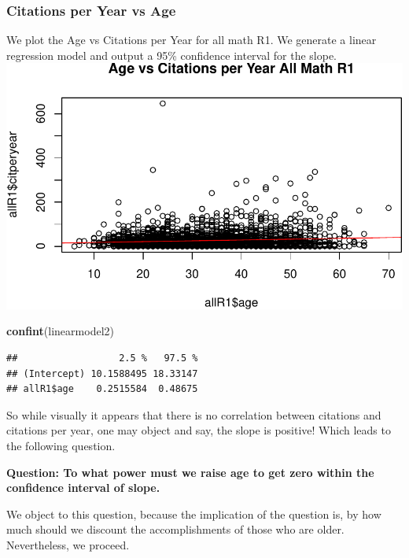 \documentclass[]{article}
\newenvironment{Shaded}{\begin{snugshade}}{\end{snugshade}}
\newcommand{\KeywordTok}[1]{\textcolor[rgb]{0.13,0.29,0.53}{\textbf{#1}}}
\newcommand{\NormalTok}[1]{#1}
\begin{document}
\hypertarget{citations-per-year-vs-age}{%
\subsubsection{Citations per Year vs
Age}\label{citations-per-year-vs-age}}

We plot the Age vs Citations per Year for all math R1. We generate a
linear regression model and output a 95\% confidence interval for the
slope. \includegraphics{index_files/figure-latex/unnamed-chunk-27-1.pdf}

\begin{Shaded}
\begin{Highlighting}[]
\KeywordTok{confint}\NormalTok{(linearmodel2)}
\end{Highlighting}
\end{Shaded}

\begin{verbatim}
##                  2.5 %   97.5 %
## (Intercept) 10.1588495 18.33147
## allR1$age    0.2515584  0.48675
\end{verbatim}

So while visually it appears that there is no correlation between
citations and citations per year, one may object and say, the slope is
positive! Which leads to the following question.

\textbf{Question: To what power must we raise age to get zero within the
confidence interval of slope.}

We object to this question, because the implication of the question is,
by how much should we discount the accomplishments of those who are
older. Nevertheless, we proceed.
\end{document}
